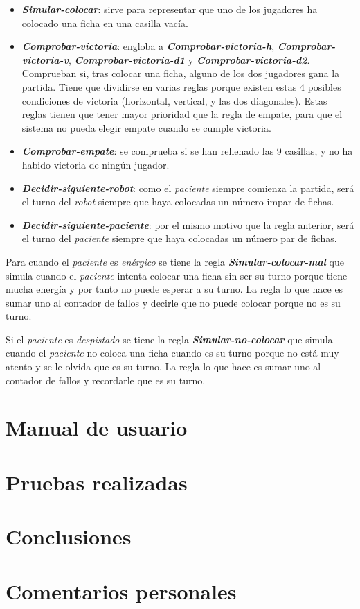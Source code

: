 \documentclass{uc3mpracticas}
\begin{document}
  \begin{itemize}
    \item \textbf{\textit{Simular-colocar}}: sirve para representar que uno de los jugadores ha colocado una ficha en una casilla vacía.
    \item \textbf{\textit{Comprobar-victoria}}: engloba a \textbf{\textit{Comprobar-victoria-h}}, \textbf{\textit{Comprobar-victoria-v}}, \textbf{\textit{Comprobar-victoria-d1}} y \textbf{\textit{Comprobar-victoria-d2}}. Comprueban si, tras colocar una ficha, alguno de los dos jugadores gana la partida. Tiene que dividirse en varias reglas porque existen estas 4 posibles condiciones de victoria (horizontal, vertical, y las dos diagonales). Estas reglas tienen que tener mayor prioridad que la regla de empate, para que el sistema no pueda elegir empate cuando se cumple victoria.
    \item \textbf{\textit{Comprobar-empate}}: se comprueba si se han rellenado las 9 casillas, y no ha habido victoria de ningún jugador.
    \item \textbf{\textit{Decidir-siguiente-robot}}: como el \textit{paciente} siempre comienza la partida, será el turno del  \textit{robot} siempre que haya colocadas un número impar de fichas.
    \item \textbf{\textit{Decidir-siguiente-paciente}}: por el mismo motivo que la regla anterior, será el turno del \textit{paciente} siempre que haya colocadas un número par de fichas.
  \end{itemize}

  Para cuando el \textit{paciente} es \textit{enérgico} se tiene la regla \textbf{\textit{Simular-colocar-mal}} que simula cuando el \textit{paciente} intenta colocar una ficha sin ser su turno porque tiene mucha energía y por tanto no puede esperar a su turno. La regla lo que hace es sumar uno al contador de fallos y decirle que no puede colocar porque no es su turno.

  \vspace{3mm}

  Si el \textit{paciente} es \textit{despistado} se tiene la regla \textbf{\textit{Simular-no-colocar}} que simula cuando el \textit{paciente} no coloca una ficha cuando es su turno porque no está muy atento y se le olvida que es su turno. La regla lo que hace es sumar uno al contador de fallos y recordarle que es su turno.

  \newpage

  \section{Manual de usuario}

  \newpage

  \section{Pruebas realizadas}

  \newpage

  \section{Conclusiones}

  \newpage

  \section{Comentarios personales}
\end{document}
